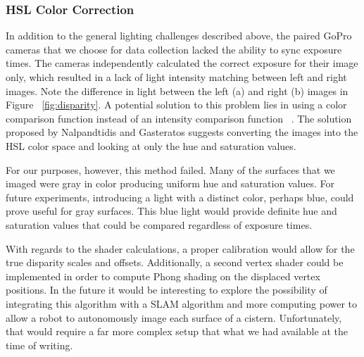 \documentclass[a4paper,twoside]{article}
\begin{document}
\subsubsection{HSL Color Correction}
\label{subsec:hsl_color_correction}
In addition to the general lighting challenges described above,  the paired GoPro cameras that we choose for data collection lacked the ability to sync exposure times.  
The cameras independently calculated the correct exposure for their image only, which resulted in a lack of light intensity matching between left and right images.
Note the difference in light between the left (a) and right (b) images in Figure ~\ref{fig:disparity}.
A potential solution to this problem lies in using a color comparison function instead of an intensity comparison function ~\cite{stereo:nalGast}.
The solution proposed by Nalpandtidis and Gasteratos suggests converting the images into the HSL color space and looking at only the hue and saturation values.  
 
For our purposes, however, this method failed.  
Many of the surfaces that we imaged were gray in color producing uniform hue and saturation values.
For future experiments, introducing a light with a distinct color, perhaps blue, could prove useful for gray surfaces.  
This blue light would provide definite hue and saturation values that could be compared regardless of exposure times.

With regards to the shader calculations, a proper calibration would allow for the true disparity scales and offsets. 
Additionally, a second vertex shader could be implemented in order to compute Phong shading on the displaced vertex positions.
In the future it would be interesting to explore the possibility of integrating this algorithm with a SLAM algorithm and more computing power to allow a robot to autonomously image each surface of a cistern. 
Unfortunately, that would require a far more complex setup that what we had available at the time of writing.




\end{document}
